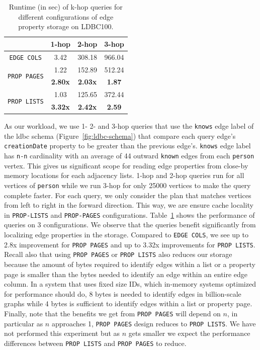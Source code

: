 \begin{table}
	\centering
	\bgroup
	\setlength{\tabcolsep}{8pt}
	\def\arraystretch{1.2}%
	\begin{tabular}{ |c|c|c|c| } 
		\hline
		& \textbf{1-hop} & \textbf{2-hop} & \textbf{3-hop} \\
		\hline \hline
		\texttt{EDGE COLS}& 3.42 & 308.18 & 966.04\\ 
		\hline 
		\multirow{2}{*}{\texttt{PROP PAGES}} & 1.22 & 152.89 & 512.24 \\ 
		& \textbf{2.80x} & \textbf{2.03x} & \textbf{1.87} \\ 
		\hline
		\multirow{2}{*}{\texttt{PROP LISTS}}& 1.03 & 125.65 & 372.44 \\ 
		& \textbf{3.32x} & \textbf{2.42x} & \textbf{2.59}\\ 
		\hline
	\end{tabular}
	\egroup
	\captionsetup{justification=centering}
	\caption{Runtime (in sec) of k-hop queries for different configurations of edge property storage on LDBC100.}
	\label{tbl:mem2}
\end{table}

As our workload, we use 1- 2- and 3-hop queries that use the \texttt{knows} edge label of the \gls{ldbc} schema (Figure~\ref{fig:ldbc-schema}) that compare each query edge's \texttt{creationDate} property to be greater than the previous edge's. \texttt{knows} edge label has \texttt{n-n} cardinality with an average of 44 outward \texttt{known} edges from each \texttt{person} vertex. This gives us significant scope for reading edge properties from close-by memory locations for each adjacency lists. 1-hop and 2-hop queries run for all vertices of \texttt{person} while we run 3-hop for only 25000 vertices to make the query complete faster. For each query, we only consider the plan that matches vertices from left to right in the forward direction. This way, we are ensure cache locality in \texttt{PROP-LISTS} and \texttt{PROP-PAGES} configurations. Table~\ref{tbl:mem2} shows the performance of queries on 3 configurations. We observe that the queries benefit significantly from localizing edge properties in the storage. Compared to \texttt{EDGE COLS}, we see up to 2.8x improvement for \texttt{PROP PAGES} and up to 3.32x improvements for \texttt{PROP LISTS}. Recall also that using \texttt{PROP PAGES} or \texttt{PROP LISTS} also reduces our storage because the amount of bytes required to identify edges within a list or a property page is smaller than the bytes needed to identify an edge within an entire edge column. In a system that uses fixed size IDs, which in-memory systems optimized for performance should do, 8 bytes is needed to identify edges in billion-scale graphs while 4 bytes is sufficient to identify edges within a list or property page. Finally, note that the benefits we get from \texttt{PROP PAGES} will depend on $n$, in particular as $n$ approaches 1, \texttt{PROP PAGES} design reduces to \texttt{PROP LISTS}. We have not performed this experiment but as $n$ gets smaller we expect the performance differences between \texttt{PROP LISTS} and \texttt{PROP PAGES} to reduce. 

